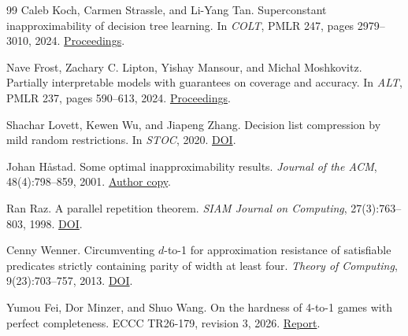 \documentclass[11pt]{article}
\begin{document}
\begin{thebibliography}{99}
Caleb Koch, Carmen Strassle, and Li-Yang Tan.
\newblock Superconstant inapproximability of decision tree learning.
\newblock In \emph{COLT}, PMLR 247, pages 2979--3010, 2024.
\newblock \href{https://proceedings.mlr.press/v247/koch24a.html}{Proceedings}.

Nave Frost, Zachary C. Lipton, Yishay Mansour, and Michal Moshkovitz.
\newblock Partially interpretable models with guarantees on coverage and accuracy.
\newblock In \emph{ALT}, PMLR 237, pages 590--613, 2024.
\newblock \href{https://proceedings.mlr.press/v237/frost24a.html}{Proceedings}.

Shachar Lovett, Kewen Wu, and Jiapeng Zhang.
\newblock Decision list compression by mild random restrictions.
\newblock In \emph{STOC}, 2020.
\newblock \href{https://doi.org/10.1145/3357713.3384241}{DOI}.

Johan H{\aa}stad.
\newblock Some optimal inapproximability results.
\newblock \emph{Journal of the ACM}, 48(4):798--859, 2001.
\newblock \href{https://people.kth.se/~johanh/optimalinap.pdf}{Author copy}.

Ran Raz.
\newblock A parallel repetition theorem.
\newblock \emph{SIAM Journal on Computing}, 27(3):763--803, 1998.
\newblock \href{https://doi.org/10.1137/S0097539795280895}{DOI}.

Cenny Wenner.
\newblock Circumventing \(d\)-to-1 for approximation resistance of satisfiable
predicates strictly containing parity of width at least four.
\newblock \emph{Theory of Computing}, 9(23):703--757, 2013.
\newblock \href{https://doi.org/10.4086/toc.2013.v009a023}{DOI}.

Yumou Fei, Dor Minzer, and Shuo Wang.
\newblock On the hardness of 4-to-1 games with perfect completeness.
\newblock ECCC TR26-179, revision 3, 2026.
\newblock \href{https://eccc.weizmann.ac.il/report/2026/179/}{Report}.

\end{thebibliography}
\end{document}
